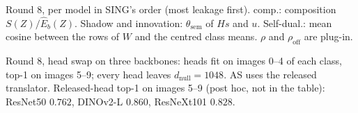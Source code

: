 \documentclass[10pt]{article}
\begin{document}
\begin{table}[H]
\centering\footnotesize

\caption{Round 8, per model in SING's order (most leakage first). comp.: composition $S(Z)/\hat E_b(Z)$. Shadow and innovation: $\theta_{\mathrm{sem}}$ of $Hs$ and $u$. Self-dual.: mean cosine between the rows of $W$ and the centred class means. $\rho$ and $\rho_{\mathrm{off}}$ are plug-in.}
\label{tab:r8models}
\end{table}

\begin{table}[H]
\centering\footnotesize

\caption{Round 8, head swap on three backbones: heads fit on images 0--4 of each class, top-1 on images 5--9; every head leaves $d_{\mathrm{null}}{=}1048$. AS uses the released translator. Released-head top-1 on images 5--9 (post hoc, not in the table): ResNet50 $0.762$, DINOv2-L $0.860$, ResNeXt101 $0.828$.}
\label{tab:r8heads}
\end{table}
\end{document}
